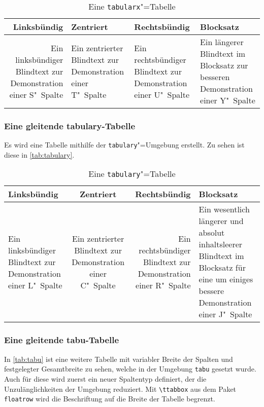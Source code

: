 \begin{table}
\begin{tabularx}{\textwidth}{@{}DEFY@{}}
\toprule
\textbf{Linksbündig} & \textbf{Zentriert} &
\textbf{Rechtsbündig} & \textbf{Blocksatz} \tabularnewline
\midrule
Ein linksbündiger Blindtext zur Demonstration einer S"~Spalte &
Ein zentrierter Blindtext zur Demonstration einer T"~Spalte &
Ein rechtsbündiger Blindtext zur Demonstration einer U"~Spalte &
Ein längerer Blindtext im Blocksatz zur besseren Demonstration
einer Y"~Spalte\tabularnewline
\bottomrule
\end{tabularx}
\caption{Eine \texttt{tabularx}"=Tabelle}\label{tab:tabularx}
\end{table}

\subsubsection{Eine gleitende tabulary-Tabelle}
Es wird eine Tabelle mithilfe der \texttt{tabulary}"=Umgebung erstellt.
Zu sehen ist diese in \autoref{tab:tabulary}.

\begin{table}
\begin{tabulary}{\textwidth}{@{}LCRJ@{}}
\toprule
\textbf{Linksbündig} & \textbf{Zentriert} &
\textbf{Rechtsbündig} & \textbf{Blocksatz} \tabularnewline\midrule
Ein linksbündiger Blindtext zur Demonstration einer L"~Spalte &
Ein zentrierter Blindtext zur Demonstration einer C"~Spalte &
Ein rechtsbündiger Blindtext zur Demonstration einer R"~Spalte &
Ein wesentlich längerer und absolut inhaltsleerer Blindtext im
Blocksatz für eine um einiges bessere Demonstration einer J"~Spalte
\tabularnewline\bottomrule
\end{tabulary}
\caption{Eine \texttt{tabulary}"=Tabelle}\label{tab:tabulary}
\end{table}

\subsubsection{Eine gleitende tabu-Tabelle}
In \autoref{tab:tabu} ist eine weitere Tabelle mit variabler Breite der
Spalten und festgelegter Gesamtbreite zu sehen, welche in der Umgebung
\texttt{tabu} gesetzt wurde. Auch für diese wird zuerst ein neuer
Spaltentyp definiert, der die Unzulänglichkeiten der Umgebung reduziert.
Mit \texttt{\textbackslash ttabbox} aus dem Paket \texttt{floatrow} wird
die Beschriftung auf die Breite der Tabelle begrenzt.

\makeatletter
\newcolumntype{Z}{}
\renewcommand*{\NC@rewrite@Z}[1][]{%
  \NC@find>{\hspace{0pt}}X[#1]<{\@finalstrut\@arstrutbox}%
}
\makeatother

